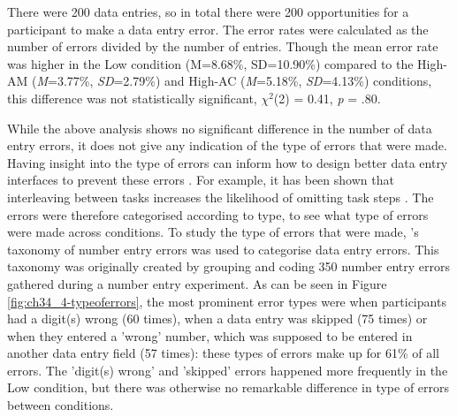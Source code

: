 There were 200 data entries, so in total there were 200 opportunities for a participant to make a data entry error. The error rates were calculated as the number of errors divided by the number of entries. Though the mean error rate was higher in the Low condition (M=8.68\%, SD=10.90\%) compared to the High-AM (\textit{M}=3.77\%, \textit{SD}=2.79\%) and High-AC (\textit{M}=5.18\%, \textit{SD}=4.13\%) conditions, this difference was not statistically significant, $\chi^2$(2) = 0.41, \textit{p} = .80. 


While the above analysis shows no significant difference in the number of data entry errors, it does not give any indication of the type of errors that were made. Having insight into the type of errors can inform how to design better data entry interfaces to prevent these errors \citep{Wiseman2011}. For example, it has been shown that interleaving between tasks increases the likelihood of omitting task steps \citep{Back2012}. %
The errors were therefore categorised according to type, to see what type of errors were made across conditions. To study the type of errors that were made, \citeauthor{Wiseman2011}'s \citeyearpar{Wiseman2011} taxonomy of number entry errors was used to categorise data entry errors. This taxonomy was originally created by grouping and coding 350 number entry errors gathered during a number entry experiment. As can be seen in Figure \ref{fig:ch34_4-typeoferrors}, the most prominent error types were when participants had a digit(s) wrong (60 times), when a data entry was skipped (75 times) or when they entered a 'wrong' number, which was supposed to be entered in another data entry field (57 times): these types of errors make up for 61\% of all errors. The 'digit(s) wrong' and 'skipped' errors happened more frequently in the Low condition, but there was otherwise no remarkable difference in type of errors between conditions. 


